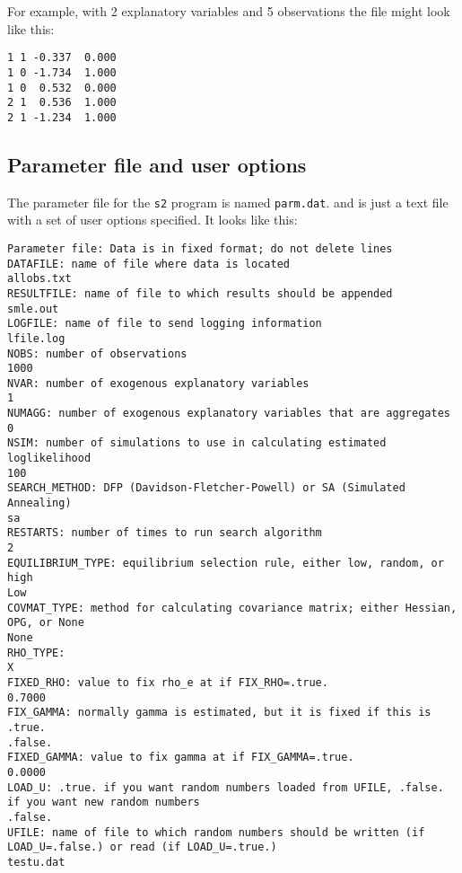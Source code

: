 \documentclass{article}
\begin{document}
For example, with 2 explanatory variables and 5 observations the 
file might look like this:
{\scriptsize
\begin{verbatim}
1 1 -0.337  0.000
1 0 -1.734  1.000
1 0  0.532  0.000
2 1  0.536  1.000
2 1 -1.234  1.000
\end{verbatim}
}

\subsection{Parameter file and user options}

The parameter file for the {\tt s2} program is named {\tt parm.dat}.
and is just a text file with a set of user options specified.  It looks like this:

{\scriptsize \begin{verbatim}
Parameter file: Data is in fixed format; do not delete lines
DATAFILE: name of file where data is located
allobs.txt
RESULTFILE: name of file to which results should be appended
smle.out
LOGFILE: name of file to send logging information
lfile.log
NOBS: number of observations
1000
NVAR: number of exogenous explanatory variables
1
NUMAGG: number of exogenous explanatory variables that are aggregates
0
NSIM: number of simulations to use in calculating estimated loglikelihood
100
SEARCH_METHOD: DFP (Davidson-Fletcher-Powell) or SA (Simulated Annealing)
sa
RESTARTS: number of times to run search algorithm
2
EQUILIBRIUM_TYPE: equilibrium selection rule, either low, random, or high
Low
COVMAT_TYPE: method for calculating covariance matrix; either Hessian, OPG, or None
None
RHO_TYPE: 
X
FIXED_RHO: value to fix rho_e at if FIX_RHO=.true.
0.7000
FIX_GAMMA: normally gamma is estimated, but it is fixed if this is .true.
.false.
FIXED_GAMMA: value to fix gamma at if FIX_GAMMA=.true.
0.0000
LOAD_U: .true. if you want random numbers loaded from UFILE, .false. if you want new random numbers
.false.
UFILE: name of file to which random numbers should be written (if LOAD_U=.false.) or read (if LOAD_U=.true.)
testu.dat
\end{verbatim}}
\end{document}
